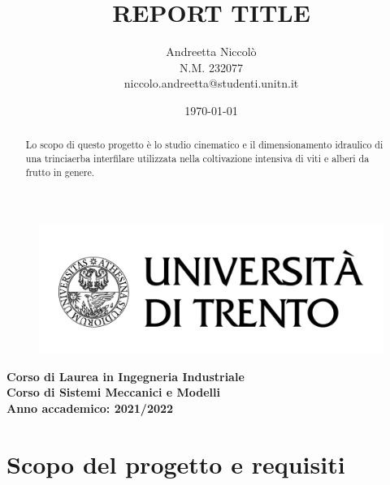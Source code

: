 \documentclass[a4paper,12pt]{article}
\title{\textbf{REPORT TITLE}}
\author{Andreetta Niccolò\\
N.M. 232077\\
niccolo.andreetta@studenti.unitn.it
}
\date{\today}
\begin{document}
\begin{figure}[H]
    \centering
    \includegraphics[scale=0.15]{immagini/logo-unitn.png}
    \maketitle
\end{figure}
\begin{center}\textbf{
    Corso di Laurea in Ingegneria Industriale\\
    Corso di {Sistemi Meccanici e Modelli}\\
    Anno accademico: 2021/2022}
\vspace{2cm}
\begin{abstract}\centering
Lo scopo di questo progetto è lo studio cinematico e il dimensionamento idraulico di una trinciaerba interfilare utilizzata nella coltivazione intensiva di viti e alberi da frutto in genere.
\end{abstract}
\end{center}
\thispagestyle{empty}
\newpage
\tableofcontents
\listoffigures
\thispagestyle{empty}
\newpage
\setcounter{page}{3}
\section{Scopo del progetto e requisiti }
\end{document}
